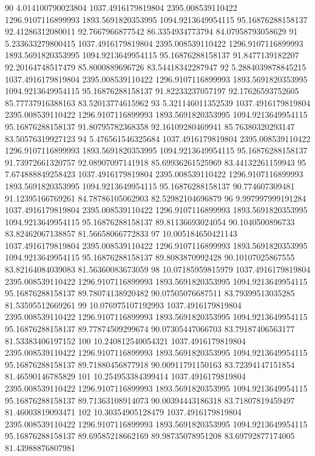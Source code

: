 {90 4.014100790023804 1037.4916179819804 2395.008539110422 1296.9107116899993 1893.5691820353995 1094.9213649954115 95.16876288158137 92.41286312080011 92.7667966877542 86.3354934773794 84.07958793058629
91 5.233633279800415 1037.4916179819804 2395.008539110422 1296.9107116899993 1893.5691820353995 1094.9213649954115 95.16876288158137 91.8477139182207 92.20164748517479 85.8000889696726 83.54418342287947
92 5.2884039878845215 1037.4916179819804 2395.008539110422 1296.9107116899993 1893.5691820353995 1094.9213649954115 95.16876288158137 91.82233237057197 92.17626593752605 85.77737916388163 83.52013774615962
93 5.321146011352539 1037.4916179819804 2395.008539110422 1296.9107116899993 1893.5691820353995 1094.9213649954115 95.16876288158137 91.80795782368358 92.16109280469941 85.76380320293147 83.50576319927123
94 5.476561546325684 1037.4916179819804 2395.008539110422 1296.9107116899993 1893.5691820353995 1094.9213649954115 95.16876288158137 91.73972661320757 92.08907097141918 85.69936261525969 83.44132261159943
95 7.674888849258423 1037.4916179819804 2395.008539110422 1296.9107116899993 1893.5691820353995 1094.9213649954115 95.16876288158137 90.774607309481 91.12395166769261 84.78786105062903 82.52982104696879
96 9.997997999191284 1037.4916179819804 2395.008539110422 1296.9107116899993 1893.5691820353995 1094.9213649954115 95.16876288158137 89.81136693024054 90.1040500896733 83.82462067138857 81.56658066772833
97 10.005184650421143 1037.4916179819804 2395.008539110422 1296.9107116899993 1893.5691820353995 1094.9213649954115 95.16876288158137 89.8083870992428 90.10107025867555 83.82164084039083 81.56360083673059
98 10.07185959815979 1037.4916179819804 2395.008539110422 1296.9107116899993 1893.5691820353995 1094.9213649954115 95.16876288158137 89.78074138920482 90.07505076687511 83.79399513035285 81.53595512669261
99 10.076975107192993 1037.4916179819804 2395.008539110422 1296.9107116899993 1893.5691820353995 1094.9213649954115 95.16876288158137 89.77874509299674 90.07305447066703 83.79187406563177 81.53383406197152
100 10.240812540054321 1037.4916179819804 2395.008539110422 1296.9107116899993 1893.5691820353995 1094.9213649954115 95.16876288158137 89.71880456877918 90.00911791150163 83.72394147151854 81.46590146785829
101 10.254953384399414 1037.4916179819804 2395.008539110422 1296.9107116899993 1893.5691820353995 1094.9213649954115 95.16876288158137 89.71363108914073 90.00394443186318 83.71807819459497 81.46003819093471
102 10.30354905128479 1037.4916179819804 2395.008539110422 1296.9107116899993 1893.5691820353995 1094.9213649954115 95.16876288158137 89.69585218662169 89.98735078951208 83.69792877174005 81.43988876807981
}
